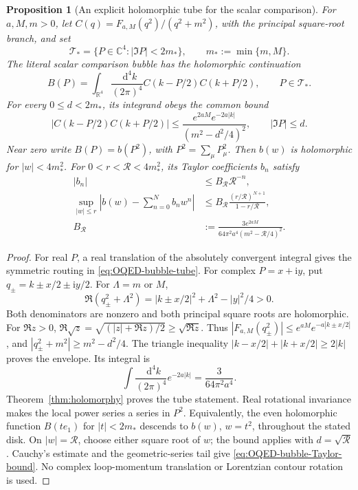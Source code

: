 \documentclass[final,5p,times,twocolumn,numbers,nopreprintline]{elsarticle}
\numberwithin{equation}{section}
\newtheorem{proposition}[theorem]{Proposition}
\theoremstyle{definition}
\theoremstyle{remark}
\newcommand{\dd}{\mathop{}\!\mathrm d}
\newcommand{\ii}{\mathrm i}
\newcommand{\RR}{\mathbb R}
\newcommand{\CC}{\mathbb C}
\begin{document}
\begin{proposition}[An explicit holomorphic tube for the scalar comparison]
\label{prop:OQED-bubble-tube}
For \(a,M,m>0\), let
\(C(q)=F_{a,M}(q^2)/(q^2+m^2)\), with the principal square-root branch, and set
\[
 \mathcal T_*=\{P\in\CC^4:|\Im P|<2m_*\},\qquad
 m_*:=\min\{m,M\}.
\]
The literal scalar comparison bubble has the holomorphic continuation
\begin{equation}
 B(P)=\int_{\RR^4}\frac{\dd^4k}{(2\pi)^4}
                     C(k-P/2)C(k+P/2),\qquad P\in\mathcal T_*.
\label{eq:OQED-bubble-tube}
\end{equation}
For every \(0\leq d<2m_*\), its integrand obeys the common bound
\begin{equation}
 |C(k-P/2)C(k+P/2)|
 \leq\frac{e^{2aM}e^{-2a|k|}}{(m^2-d^2/4)^2},
 \qquad |\Im P|\leq d.
\label{eq:OQED-bubble-tube-majorant}
\end{equation}
Near zero write \(B(P)=b(P^2)\), with \(P^2=\sum_\mu P_\mu^2\).
Then \(b(w)\) is holomorphic for \(|w|<4m_*^2\). For
\(0<r<\mathcal R<4m_*^2\), its Taylor coefficients \(b_n\) satisfy
\begin{equation}
\begin{aligned}
 |b_n|&\leq B_{\mathcal R}\mathcal R^{-n},\\
 \sup_{|w|\leq r}\left|b(w)-\sum_{n=0}^N b_n w^n\right|
   &\leq B_{\mathcal R}
          \frac{(r/\mathcal R)^{N+1}}{1-r/\mathcal R},\\
 B_{\mathcal R}&:=\frac{3e^{2aM}}
           {64\pi^2a^4(m^2-\mathcal R/4)^2}.
\end{aligned}
\label{eq:OQED-bubble-Taylor-bound}
\end{equation}
\end{proposition}
\begin{proof}
For real \(P\), a real translation of the absolutely convergent
integral gives the symmetric routing in \eqref{eq:OQED-bubble-tube}.
For complex \(P=x+\ii y\), put \(q_\pm=k\pm x/2\pm\ii y/2\).
For \(\Lambda=m\) or \(M\),
\[
 \Re(q_\pm^2+\Lambda^2)
   =|k\pm x/2|^2+\Lambda^2-|y|^2/4>0.
\]
Both denominators are nonzero and both principal square roots are
holomorphic. For \(\Re z>0\),
\(\Re\sqrt z=\sqrt{(|z|+\Re z)/2}\geq\sqrt{\Re z}\).
Thus \(|F_{a,M}(q_\pm^2)|\leq e^{aM}e^{-a|k\pm x/2|}\),
and \(|q_\pm^2+m^2|\geq m^2-d^2/4\). The triangle inequality
\(|k-x/2|+|k+x/2|\geq2|k|\) proves the envelope. Its integral is
\[
 \int\frac{\dd^4k}{(2\pi)^4}e^{-2a|k|}
                =\frac{3}{64\pi^2a^4}.
\]
Theorem~\ref{thm:holomorphy} proves the tube statement. Real rotational
invariance makes the local power series a series in \(P^2\).
Equivalently, the even holomorphic function \(B(te_1)\) for
\(|t|<2m_*\) descends to \(b(w)\), \(w=t^2\), throughout the
stated disk. On \(|w|=\mathcal R\), choose either square root of
\(w\); the bound applies with \(d=\sqrt{\mathcal R}\).
Cauchy's estimate and the geometric-series tail give
\eqref{eq:OQED-bubble-Taylor-bound}. No complex loop-momentum
translation or Lorentzian contour rotation is used.
\end{proof}
\end{document}
